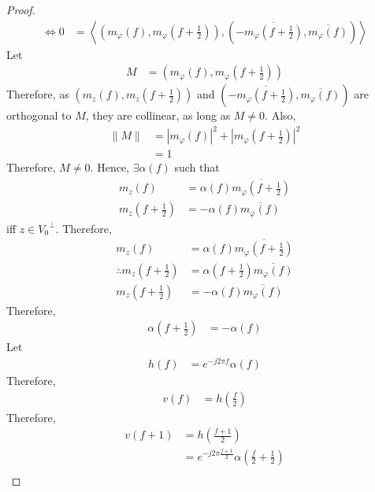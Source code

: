 \documentclass[titlepage, fleqn, a4paper, 12pt, twoside]{article}
\theoremstyle{definition}
\theoremstyle{theorem}
\begin{document}
\begin{proof}
\begin{align*}
		\iff 0 &= \left\langle \left( m_{\varphi}(f) , m_{\varphi}\left( f + \frac{1}{2} \right) \right) , \left( -\overline{m_{\varphi}\left( f + \frac{1}{2} \right)} , \overline{m_{\varphi}(f)} \right) \right\rangle
	\end{align*}
	Let
	\begin{align*}
		M &= \left( m_{\varphi}(f) , m_{\varphi}\left( f + \frac{1}{2} \right) \right)
	\end{align*}
	Therefore, as $\left( m_z(f) , m_z\left( f + \frac{1}{2} \right) \right)$ and $\left( -\overline{m_{\varphi}\left( f + \frac{1}{2} \right)} , \overline{m_{\varphi}(f)} \right)$ are orthogonal to $M$, they are collinear, as long as $M \neq 0$.
	Also,
	\begin{align*}
		\|M\| &= \left| m_{\varphi}(f) \right|^2 + \left| m_{\varphi}\left( f + \frac{1}{2} \right) \right|^2\\
		&= 1
	\end{align*}
	Therefore, $M \neq 0$.
	Hence, $\exists \alpha(f)$ such that
	\begin{align*}
		m_z(f) &= \alpha(f) \overline{m_{\varphi}\left( f + \frac{1}{2} \right)}\\
		m_z\left( f + \frac{1}{2} \right) &= -\alpha(f) \overline{m_{\varphi}(f)}
	\end{align*}
	iff $z \in {V_0}^{\perp}$.
	Therefore,
	\begin{align*}
		m_z(f) &= \alpha(f) \overline{m_{\varphi}\left( f + \frac{1}{2} \right)}\\
		\therefore m_z\left( f + \frac{1}{2} \right) &= \alpha\left( f + \frac{1}{2} \right) \overline{m_{\varphi}(f)}\\
		m_z\left( f + \frac{1}{2} \right) &= -\alpha(f) \overline{m_{\varphi}(f)}
	\end{align*}
	Therefore,
	\begin{align*}
		\alpha\left( f + \frac{1}{2} \right) &= -\alpha(f)
	\end{align*}
	Let
	\begin{align*}
		h(f) &= e^{-j 2 \pi f} \alpha(f)
	\end{align*}
	Therefore,
	\begin{align*}
		v(f) &= h\left( \frac{f}{2} \right)
	\end{align*}
	Therefore,
	\begin{align*}
		v(f + 1) &= h\left( \frac{f + 1}{2} \right)\\
		&= e^{-j 2 \pi \frac{f + 1}{2}} \alpha\left( \frac{f}{2} + \frac{1}{2} \right)\\

\end{align*}
\end{proof}
\end{document}
